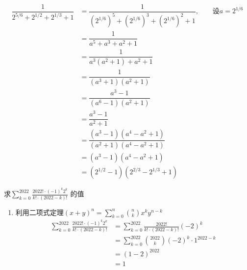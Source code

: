 \documentclass[answers]{exam}
\begin{document}
\begin{questions}
	\begin{solution}
		\begin{align*}
			\dfrac{1}{2^{5/6} + 2^{1/2} + 2^{1/3} + 1} & = \dfrac{1}{(2^{1/6})^5 + (2^{1/6})^3 + (2^{1/6})^2 + 1},
			\qquad \text{设} a = 2^{1/6}                                                                              \\
			                                           & = \dfrac{1}{a^5 + a^3 + a^2 + 1}                             \\
			                                           & = \dfrac{1}{a^3(a^2 + 1) + a^2 + 1}                          \\
			                                           & = \dfrac{1}{(a^3 + 1)(a^2 + 1)}                              \\
			                                           & = \dfrac{a^3 - 1}{(a^6 - 1)(a^2 + 1)}                        \\
			                                           & = \dfrac{a^3 - 1}{a^2 + 1}                                 \\
			                                           & = \dfrac{(a^3 - 1)(a^4 - a^2 + 1)}{(a^2 + 1)(a^4 - a^2 + 1)} \\
			                                           & = (a^3 - 1)(a^4 - a^2 + 1)                                   \\
			                                           & = (2^{1/2} - 1)(2^{2/3} - 2^{1/3} + 1)
		\end{align*}
	\end{solution}

	\question 求\(  \displaystyle\sum_{k=0}^{2022}\frac{2022!\cdot (-1)^k2^k}{k! \cdot (2022-k)!}\) 的值
	\begin{solution}
		\begin{enumerate}
			\item 利用二项式定理$\displaystyle(x+y)^n = \sum_{k=0}^{n}\binom{n}{k}x^ky^{n-k}$
			      \begin{align}
				      \sum_{k=0}^{2022}\frac{2022!\cdot(-1)^k2^k}{k!\cdot(2022-k)!} & = \sum_{k=0}^{2022}\frac{2022!}{k!\cdot
				      (2022-k)!}(-2)^k                                                                                        \\
				                                                                    & =
				      \sum_{k=0}^{2022}\binom{2022}{k}(-2)^k\cdot 1^{2022-k}                                                  \\
				                                                                    & = (1-2)^{2022}                          \\
				                                                                    & = 1
			      \end{align}
		\end{enumerate}
	\end{solution}


\end{questions}
\end{document}
